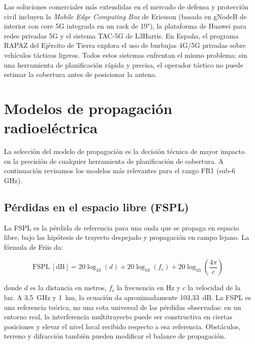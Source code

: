 Las soluciones comerciales más extendidas en el mercado de defensa y protección civil
incluyen la \textit{Mobile Edge Computing Box} de Ericsson (basada en gNodeB de
interior con core 5G integrada en un rack de 19"), la plataforma de Huawei para
redes privadas 5G y el sistema TAC-5G de L3Harris. En España, el programa RAPAZ del
Ejército de Tierra explora el uso de burbujas 4G/5G privadas sobre vehículos tácticos
ligeros. Todos estos sistemas enfrentan el mismo problema: sin una herramienta de
planificación rápida y precisa, el operador táctico no puede estimar la cobertura antes
de posicionar la antena.

\section{Modelos de propagación radioeléctrica}
\label{sec:propagacion}

La selección del modelo de propagación es la decisión técnica de mayor impacto en la
precisión de cualquier herramienta de planificación de cobertura. A continuación
revisamos los modelos más relevantes para el rango FR1 (sub-6 GHz).

\subsection{Pérdidas en el espacio libre (FSPL)}
\label{subsec:fspl}

La FSPL es la pérdida de referencia para una onda que se propaga en espacio libre, bajo
las hipótesis de trayecto despejado y propagación en campo lejano. La fórmula de Friis da:

\begin{equation}
\text{FSPL}~[\text{dB}] = 20\log_{10}(d) + 20\log_{10}(f_c) + 20\log_{10}\!\left(\frac{4\pi}{c}\right)
\label{eq:fspl_cap2}
\end{equation}

donde $d$ es la distancia en metros, $f_c$ la frecuencia en Hz y $c$ la velocidad de la
luz. A 3,5~GHz y 1~km, la ecuación da aproximadamente 103,33~dB. La FSPL es una referencia
teórica, no una cota universal de las pérdidas observadas: en un entorno real, la
interferencia multitrayecto puede ser constructiva en ciertas posiciones y elevar el nivel
local recibido respecto a esa referencia. Obstáculos, terreno y difracción también pueden
modificar el balance de propagación.

